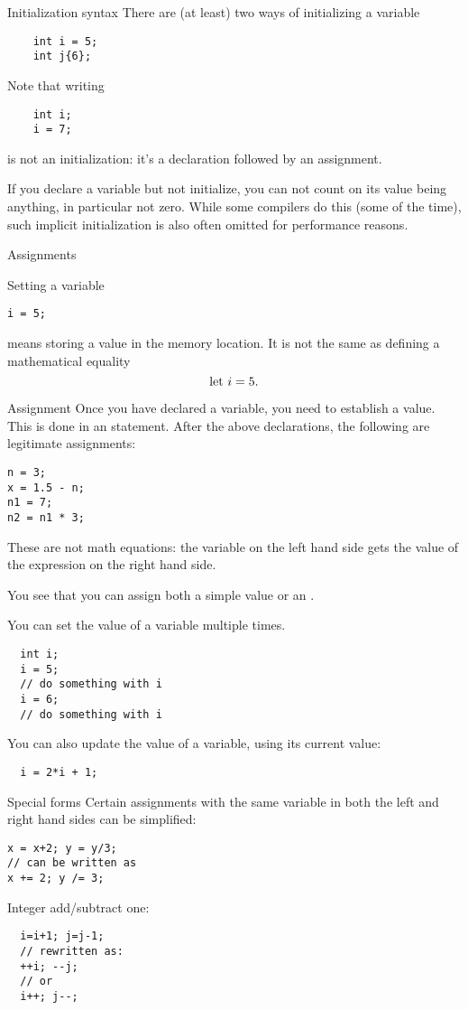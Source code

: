 \begin{block}{Initialization syntax}
  \label{sl:init-var}
  There are (at least) two ways of initializing a variable
  \begin{lstlisting}
    int i = 5;
    int j{6};
  \end{lstlisting}
  Note that writing 
  \begin{lstlisting}
    int i;
    i = 7;
  \end{lstlisting}
  is not an initialization: it's a declaration followed by an
  assignment.
\end{block}

If you declare a variable but not initialize, you can not count on
its value being anything, in particular not zero.
While some compilers do this (some of the time),
such implicit initialization is also
often omitted for performance reasons.

 {Assignments}
\label{c:assign}

Setting a variable
\begin{lstlisting}
i = 5;
\end{lstlisting}
means storing a value in the memory location. It is
not the same as defining a mathematical equality
\[ \hbox{let $i=5$}. \]

\begin{block}{Assignment}
  \label{sl:assign1}
  Once you have declared a variable, you need to establish a value. This is done in an
   statement. After the above declarations, the
  following are legitimate assignments:
\begin{lstlisting}
n = 3;
x = 1.5 - n;
n1 = 7;
n2 = n1 * 3;
\end{lstlisting}
These are not math equations: the variable on the left hand side
gets the value of the expression on the right hand side.

You see that you can assign both a simple value or an
.
\end{block}

You can set the value of a variable multiple times.
\begin{lstlisting}
  int i;
  i = 5;
  // do something with i
  i = 6;
  // do something with i
\end{lstlisting}
You can also update the value of a variable,
using its current value:
\begin{lstlisting}
  i = 2*i + 1;
\end{lstlisting}

\begin{block}{Special forms}
  \label{sl:special-assign}
  Certain assignments with the same variable in both the
  left and right hand sides can be simplified:
\begin{lstlisting}
x = x+2; y = y/3;
// can be written as
x += 2; y /= 3;
\end{lstlisting}
Integer add/subtract one:
\begin{lstlisting}
  i=i+1; j=j-1;
  // rewritten as:
  ++i; --j;
  // or
  i++; j--;
\end{lstlisting}
\end{block}

